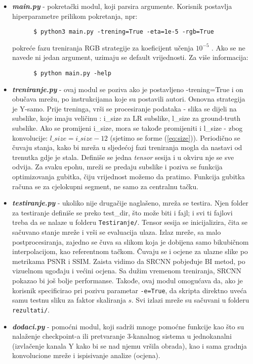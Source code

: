 \documentclass[12pt]{report}
\numberwithin{equation}{section}
\begin{document}
  \begin{itemize}
  
   \item \textit{\textbf{main.py}} - pokretački modul, koji parsira argumente. Korisnik postavlja hiperparametre prilikom pokretanja, npr: 
   \begin{lstlisting}
      $ python3 main.py -trening=True -eta=1e-5 -rgb=True
   \end{lstlisting}
    pokreće fazu treniranja RGB strategije za koeficijent učenja $10^{-5}$ . Ako se ne navede ni jedan argument, uzimaju se default vrijednosti. Za više informacija:
     \begin{lstlisting}
      $ python main.py -help
   \end{lstlisting}
    \item \textit{\textbf{treniranje.py}} - ovaj modul se poziva ako je postavljeno -trening=True i on obučava mrežu, po instrukcijama koje su postavili autori. Osnovna strategija je Y-samo. Prije treninga, vrši se procesiranje podataka - slika se dijeli na subslike, koje imaju veličinu : i\_size za LR subslike, l\_size za ground-truth subslike. Ako se promijeni i\_size, mora se takođe promijeniti i l\_size - zbog konvolucije: $l\_size=i\_size-12$ (sjetimo se forme (\ref{eq:size})). Periodično se čuvaju stanja, kako bi mreža u sljedećoj fazi treniranja mogla da nastavi od trenutka gdje je stala. Definiše se jedna \textit{tensor} sesija i u okviru nje se sve odvija. Za svaku epohu,  mreži se predaju subslike i poziva se funkcija optimizovanja gubitka, čiju vrijednost možemo da pratimo. Funkcija gubitka računa se za cjelokupni segment, ne samo za centralnu tačku.  
    
    \item \textbf{\textit{testiranje.py}} - ukoliko nije drugačije naglašeno, mreža se testira. Njen folder za testiranje definiše se preko test\_dir, što može biti i fajl; i svi ti fajlovi treba da se nalaze u folderu \texttt{Testiranje/}.  Tensor sesija se inicijalizira, čita se sačuvano stanje mreže i vrši se evaluacija ulaza. Izlaz mreže, sa malo postprocesiranja, zajedno se čuva sa slikom koja je dobijena samo bikubičnom interpolacijom, kao referentnom tačkom. Čuvaju se i ocjene za ulazne slike po metrikama PSNR i SSIM. Zaista vidimo da SRCNN pobjeđuje BI metod, po vizuelnom ugođaju i većini ocjena. Sa dužim vremenom treniranja, SRCNN pokazao bi još bolje performanse.  Takođe, ovaj modul omogućava da, ako je korisnik specificirao pri pozivu parametar \texttt{-e=True}, da skripta direktno uveća samu testnu sliku za faktor skaliranja $s$. Svi izlazi mreže su sačuvani u folderu \texttt{rezultati/}.
    
    \item \textit{\textbf{dodaci.py}} - pomoćni modul, koji sadrži mnoge pomoćne funkcije kao što su nalaženje checkpoint-a ili pretvaranje 3-kanalnog sistema u jednokanalni (izvlačenje kanala Y kako bi se nad njemu vršila obrada), kao i sama gradnja konvolucione mreže i ispisivanje analize (ocjena).
  \end{itemize}
  
\end{document}
